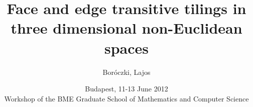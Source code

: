 \usepackage[english]{babel}
\usepackage[T1]{fontenc}
\usepackage[utf8]{inputenc}
\usepackage{graphicx}
\usepackage{listings}
\usepackage{amsmath}
\usepackage{amssymb}
\usepackage{ae,aecompl}
\usepackage{fix-cm}


\beamertemplatenavigationsymbolsempty

\title{Face and edge transitive tilings in three dimensional non-Euclidean
spaces}
\author{Boróczki, Lajos}
\date{Budapest, 11-13 June 2012 \\{\tiny Workshop of the BME Graduate School of
Mathematics and Computer Science}}



\begin{frame}
  \maketitle
\end{frame}

\begin{frame}
  \tableofcontents
\end{frame}
\newpage

